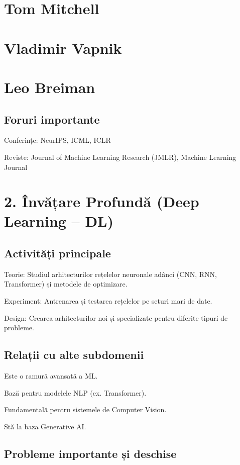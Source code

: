 \documentclass[12pt]{article}
\begin{document}
\section*{Tom Mitchell}

\section*{Vladimir Vapnik}

\section*{Leo Breiman}

\subsection*{Foruri importante}

Conferințe: NeurIPS, ICML, ICLR

Reviste: Journal of Machine Learning Research (JMLR), Machine Learning Journal

\section{2. Învățare Profundă (Deep Learning – DL)}

\subsection*{Activități principale}

Teorie: Studiul arhitecturilor rețelelor neuronale adânci (CNN, RNN, Transformer) și metodele de optimizare.

Experiment: Antrenarea și testarea rețelelor pe seturi mari de date.

Design: Crearea arhitecturilor noi și specializate pentru diferite tipuri de probleme.

\subsection*{Relații cu alte subdomenii}

Este o ramură avansată a ML.

Bază pentru modelele NLP (ex. Transformer).

Fundamentală pentru sistemele de Computer Vision.

Stă la baza Generative AI.

\subsection*{Probleme importante și deschise}
\end{document}
